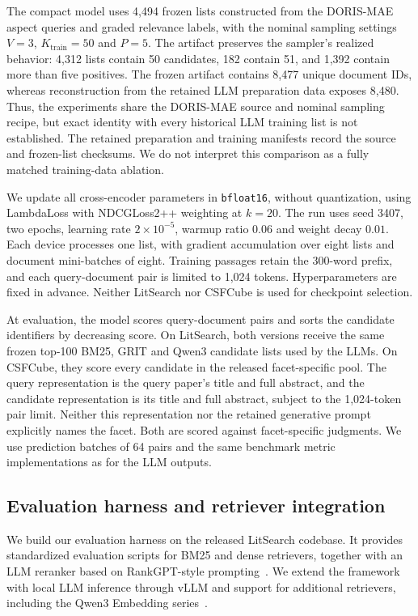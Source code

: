 \documentclass[pdflatex,sn-basic,Numbered]{sn-jnl}%
\theoremstyle{thmstyleone}%
\theoremstyle{thmstyletwo}%
\theoremstyle{thmstylethree}%
\begin{document}
The compact model uses 4,494 frozen lists constructed from the DORIS-MAE
aspect queries and graded relevance labels, with the nominal sampling settings
$V=3$, $K_{\mathrm{train}}=50$ and $P=5$. The artifact preserves the sampler's
realized behavior: 4,312 lists contain 50 candidates, 182 contain 51, and 1,392
contain more than five positives. The frozen artifact contains 8,477 unique
document IDs,
whereas reconstruction from the retained LLM preparation data exposes 8,480.
Thus, the experiments share the DORIS-MAE source and nominal sampling recipe,
but exact identity with every historical LLM training list is not established.
The retained preparation and training manifests record the source and
frozen-list checksums. We do not interpret this comparison as a fully matched
training-data ablation.

We update all cross-encoder parameters in \texttt{bfloat16}, without
quantization, using LambdaLoss with NDCGLoss2++ weighting at $k=20$.
The run uses seed 3407, two epochs, learning rate $2\times10^{-5}$,
warmup ratio $0.06$ and weight decay $0.01$. Each device processes one list,
with gradient accumulation over eight lists and document mini-batches of eight.
Training passages retain the 300-word prefix, and each query-document pair is
limited to 1,024 tokens. Hyperparameters are fixed in advance. Neither LitSearch
nor CSFCube is used for checkpoint selection.

At evaluation, the model scores query-document pairs and sorts the candidate
identifiers by decreasing score. On LitSearch, both versions receive the same
frozen top-100 BM25, GRIT and Qwen3 candidate lists used by the LLMs. On
CSFCube, they score every candidate in the released facet-specific pool. The
query representation is the query paper's title and full abstract, and the
candidate representation is its title and full abstract, subject to the
1,024-token pair limit. Neither this representation nor the retained generative
prompt explicitly names the facet. Both are scored against facet-specific
judgments. We use prediction batches of
64 pairs and the same benchmark metric implementations as for the LLM outputs.

\subsection{Evaluation harness and retriever integration}

We build our evaluation harness on the released LitSearch codebase. It provides
standardized evaluation scripts for BM25 and dense retrievers, together with an
LLM reranker based on RankGPT-style prompting~\cite{Sun}. We extend the
framework with local LLM inference through vLLM \cite{Kwon} and support for
additional retrievers, including the Qwen3 Embedding series~\cite{Zhang}.
\end{document}
